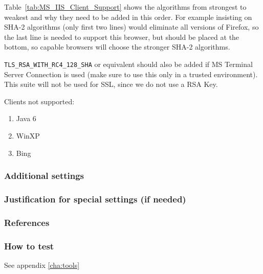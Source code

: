 Table~\ref{tab:MS_IIS_Client_Support} shows the algorithms from
strongest to weakest and why they need to be added in this order. For
example insisting on SHA-2 algorithms (only first two lines) would
eliminate all versions of Firefox, so the last line is needed to
support this browser, but should be placed at the bottom, so capable
browsers will choose the stronger SHA-2 algorithms.

\verb|TLS_RSA_WITH_RC4_128_SHA| or equivalent should also be added if
MS Terminal Server Connection is used (make sure to use this only in a
trusted environment). This suite will not be used for SSL, since we do
not use a RSA Key.


Clients not supported:
\begin{enumerate}
  \item Java 6
  \item WinXP
  \item Bing
\end{enumerate}


\subsubsection{Additional settings}


\subsubsection{Justification for special settings (if needed)}


\subsubsection{References}



\subsubsection{How to test}
See appendix \ref{cha:tools}

